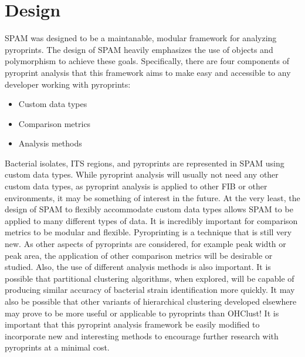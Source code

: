 \documentclass[12pt]{ucthesis}
\begin{document}
   \section{Design}\label{sec:design}
      SPAM was designed to be a maintanable, modular framework for analyzing
      pyroprints. The design of SPAM heavily emphasizes the use of objects and
      polymorphism to achieve these goals. Specifically, there are four
      components of pyroprint analysis that this framework aims to make easy
      and accessible to any developer working with pyroprints:
      \begin{itemize}
         \item Custom data types
         \item Comparison metrics
         \item Analysis methods
      \end{itemize}
      Bacterial isolates, ITS regions, and pyroprints are represented in SPAM
      using custom data types. While pyroprint analysis will usually not need
      any other custom data types, as pyroprint analysis is applied to other
      FIB or other environments, it may be something of interest in the future.
      At the very least, the design of SPAM to flexibly accommodate custom data
      types allows SPAM to be applied to many different types of data. It is
      incredibly important for comparison metrics to be modular and flexible.
      Pyroprinting is a technique that is still very new. As other aspects of
      pyroprints are considered, for example peak width or peak area, the
      application of other comparison metrics will be desirable or studied.
      Also, the use of different analysis methods is also important. It is
      possible that partitional clustering algorithms, when explored, will be
      capable of producing similar accuracy of bacterial strain identification
      more quickly. It may also be possible that other variants of hierarchical
      clustering developed elsewhere may prove to be more useful or applicable
      to pyroprints than \textsf{OHClust!} It is important that this pyroprint
      analysis framework be easily modified to incorporate new and interesting
      methods to encourage further research with pyroprints at a minimal cost.
\end{document}

